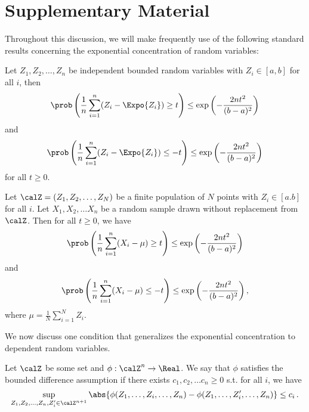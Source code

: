 \onecolumn




\section*{Supplementary Material}


Throughout this discussion, 
we will make frequently use 
of the following standard results
concerning the exponential concentration 
of random variables:

\begin{lemma} Let $Z_1, Z_2, \ldots, Z_n$ be independent bounded random variables with $Z_i \in [a,b]$ for all $i$, then 
    \begin{align*}
        \prob\left( \frac{1}{n} \sum_{i=1}^n (Z_i - \Expo{Z_i}) \ge t \right) \le \exp{\left( -\frac{2nt^2}{(b-a)^2} \right) }
    \end{align*} 
    and 
    \begin{align*}
        \prob\left( \frac{1}{n} \sum_{i=1}^n (Z_i - \Expo{Z_i}) \le -t \right) \le \exp{\left( -\frac{2nt^2}{(b-a)^2} \right) }
    \end{align*} 
    for all $t \ge 0$. 
\end{lemma}

\begin{lemma} \label{lem:hoeffding_sampling} Let $\calZ = (Z_1, Z_2, \ldots, Z_N)$ be a finite population of $N$ points with $Z_i \in [a.b]$ for all $i$. Let $X_1, X_2, \ldots X_n$ be a random sample drawn without replacement from $\calZ$. Then for all $t \ge 0$, we have 
    \begin{align*}
        \prob\left( \frac{1}{n} \sum_{i=1}^n (X_i - \mu ) \ge t \right) \le \exp{\left( -\frac{2nt^2}{(b-a)^2} \right) }
    \end{align*} 
    and 
    \begin{align*}
        \prob\left( \frac{1}{n} \sum_{i=1}^n (X_i - \mu ) \le -t \right) \le \exp{\left( -\frac{2nt^2}{(b-a)^2} \right) } \,,
    \end{align*} 
    where $\mu = \frac{1}{N} \sum_{i=1}^{N} Z_i$. 
\end{lemma}

We now discuss one condition that generalizes the exponential concentration to dependent random variables.
\begin{condition} \label{cond:BDC} Let $\calZ$ be some set and $\phi: \calZ^n \to \Real$. We say that $\phi$ satisfies the bounded difference assumption if 
there exists $c_1, c_2, \ldots c_n \ge 0$ s.t. for all $i$, we have 
\begin{align*}
    \sup_{Z_1,Z_2, \ldots,Z_n, Z_i^\prime \in \calZ^{n+1} } \abs{\phi (Z_1, \ldots, Z_i, \ldots, Z_n ) - \phi (Z_1, \ldots, Z_i^\prime, \ldots, Z_n ) } \le c_i \,.
\end{align*} 
\end{condition}

